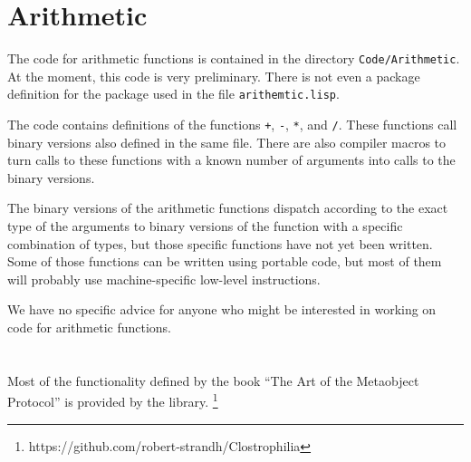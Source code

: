 \section{Arithmetic}

The code for arithmetic functions is contained in the directory
\texttt{Code/Arithmetic}.  At the moment, this code is very
preliminary.  There is not even a package definition for the package
used in the file \texttt{arithemtic.lisp}.

The code contains definitions of the functions \texttt{+}, \texttt{-},
\texttt{*}, and \texttt{/}.  These functions call binary versions also
defined in the same file.  There are also compiler macros to turn
calls to these functions with a known number of arguments into calls
to the binary versions.

The binary versions of the arithmetic functions dispatch according to
the exact type of the arguments to binary versions of the function
with a specific combination of types, but those specific functions
have not yet been written.  Some of those functions can be written
using portable code, but most of them will probably use
machine-specific low-level instructions. 

We have no specific advice for anyone who might be interested in
working on code for arithmetic functions.  

\section{\clos{}}
\label{sec-clos}

Most of the functionality defined by the book ``The Art of the
Metaobject Protocol'' is provided by the \clostrophilia{} library.%
\footnote{https://github.com/robert-strandh/Clostrophilia}



